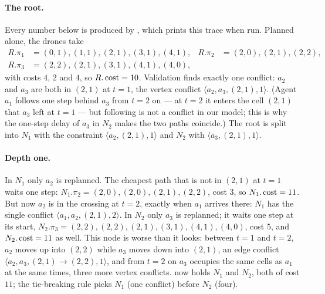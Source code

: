 \paragraph{The root.} Every number below is produced by
, which prints this trace when run. Planned alone,
the drones take
\begin{align*}
R.\pi_1 &= (0,1),(1,1),(2,1),(3,1),(4,1), &
R.\pi_2 &= (2,0),(2,1),(2,2), \\
R.\pi_3 &= (2,2),(2,1),(3,1),(4,1),(4,0),
\end{align*}
with costs $4$, $2$ and $4$, so $R.\operatorname{cost} = 10$. Validation finds exactly one
conflict: $a_2$ and $a_3$ are both in $(2,1)$ at $t = 1$, the vertex
conflict $\langle a_2, a_3, (2,1), 1\rangle$. (Agent $a_1$ follows one step
behind $a_3$ from $t=2$ on --- at $t=2$ it enters the cell $(2,1)$ that
$a_3$ left at $t=1$ --- but following is not a conflict in our model; this
is why the one-step delay of $a_3$ in $N_2$ makes the two paths coincide.)
The root is split into $N_1$ with the constraint $\langle a_2, (2,1), 1\rangle$
and $N_2$ with $\langle a_3, (2,1), 1\rangle$.

\paragraph{Depth one.} In $N_1$ only $a_2$ is replanned. The cheapest path
that is not in $(2,1)$ at $t=1$ waits one step: $N_1.\pi_2 =
(2,0),(2,0),(2,1),(2,2)$, cost $3$, so $N_1.\operatorname{cost} = 11$. But now $a_2$ is in
the crossing at $t = 2$, exactly when $a_1$ arrives there: $N_1$ has the
single conflict $\langle a_1, a_2, (2,1), 2\rangle$. In $N_2$ only $a_3$ is
replanned; it waits one step at its start, $N_2.\pi_3 =
(2,2),(2,2),(2,1),(3,1),(4,1),(4,0)$, cost $5$, and $N_2.\operatorname{cost} = 11$ as
well. This node is worse than it looks: between $t = 1$ and $t = 2$, $a_2$ moves
up into $(2,2)$ while $a_3$ moves down into $(2,1)$, an edge conflict
$\langle a_2, a_3, (2,1)\to(2,2), 1\rangle$, and from $t=2$ on $a_3$ occupies
the same cells as $a_1$ at the same times, three more vertex conflicts.
\Open now holds $N_1$ and $N_2$, both of cost $11$; the tie-breaking rule
picks $N_1$ (one conflict) before $N_2$ (four).

